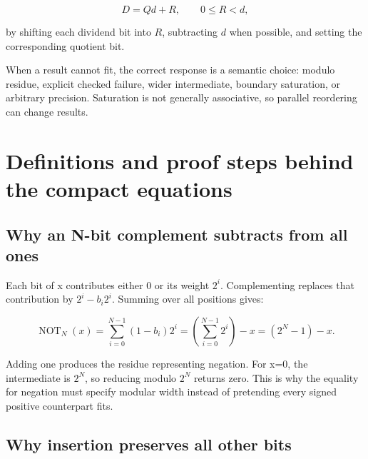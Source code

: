 \[
D=Qd+R,\qquad 0\le R<d,
\]

by shifting each dividend bit into \(R\), subtracting \(d\) when possible, and setting the corresponding quotient bit.

When a result cannot fit, the correct response is a semantic choice: modulo residue, explicit checked failure, wider intermediate, boundary saturation, or arbitrary precision. Saturation is not generally associative, so parallel reordering can change results.

\section{Definitions and proof steps behind the compact equations}\label{03-visual-computing-i-ch018-definitions-and-proof-steps-behind-the-compact-equations}

\hypertarget{03-visual-computing-i-ch018-definitions-and-proof-steps-behind-the-compact-equations}{}

\subsection{Why an N-bit complement subtracts from all ones}\label{03-visual-computing-i-ch018-why-an-n-bit-complement-subtracts-from-all-ones}

\hypertarget{03-visual-computing-i-ch018-why-an-n-bit-complement-subtracts-from-all-ones}{}

Each bit of x contributes either 0 or its weight \(2^i\). Complementing replaces that contribution by \(2^i-b_i2^i\). Summing over all positions gives:

\[
\operatorname{NOT}_N(x)=\sum_{i=0}^{N-1}(1-b_i)2^i
=\left(\sum_{i=0}^{N-1}2^i\right)-x=(2^N-1)-x.
\]

Adding one produces the residue representing negation. For x=0, the intermediate is \(2^N\), so reducing modulo \(2^N\) returns zero. This is why the equality for negation must specify modular width instead of pretending every signed positive counterpart fits.

\subsection{Why insertion preserves all other bits}\label{03-visual-computing-i-ch018-why-insertion-preserves-all-other-bits}

\hypertarget{03-visual-computing-i-ch018-why-insertion-preserves-all-other-bits}{}

